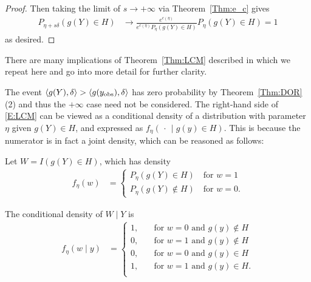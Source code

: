 \begin{proof}
Then taking the limit of $s \to +\infty$ via Theorem~\ref{Thm:e_c} gives
\begin{align*}
 P_{\eta+s\delta}(g(Y) \in H)
		&\to \frac{e^{c(\eta)}}{ e^{c(\eta)} P_\eta (g(Y) \in H) } P_\eta (g(Y)\in H) = 1
 \end{align*}
 as desired.   
\end{proof}


There are many implications of Theorem~\ref{Thm:LCM} described in \citep{Geyer:gdor}
which we repeat here and go into more detail for further clarity.

The event $\langle g(Y),\delta \rangle > \langle g(y_{\text{obs}}),\delta \rangle$ has zero probability by 
Theorem~\ref{Thm:DOR}(2) and thus the $+\infty$ case need not be considered.
The right-hand side of \eqref{E:LCM} can be viewed as a conditional density of a 
distribution with parameter $\eta$ given $g(Y) \in H$, and expressed as $f_{\eta}
(\, \cdot\,  \mid g(y) \in H)$.  This is because the numerator
is in fact a joint density, which can be reasoned as follows:

Let $W = I(g(Y) \in H)$, which has density 
\begin{align*}
	f_\eta(w) &= \begin{cases}
					P_\eta(g(Y) \in H) \quad \text{for $w=1$} \\
					P_\eta(g(Y) \notin H) \quad \text{for $w=0$}.
				\end{cases}
\end{align*}

The conditional density of $W \mid Y$ is
\begin{align*}
	f_\eta(w \mid y) &= \begin{cases}
			1, 	\quad &\text{for $w=0$ and $g(y) \notin H$}\\
			0, 	\quad &\text{for $w=1$ and $g(y) \notin H$}\\
			0, 	\quad &\text{for $w=0$ and $g(y) \in H$}\\
			1, 	\quad &\text{for $w=1$ and $g(y) \in H$}.\\
 		\end{cases}
\end{align*}

